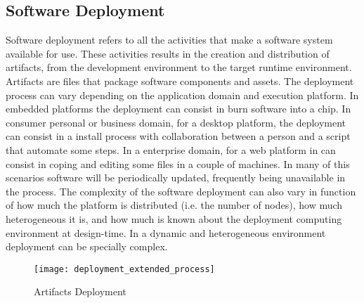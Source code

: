\subsection{Software Deployment}

Software deployment refers to all the activities that make a software system available for use\cite{carzaniga_characterization_1998}. These activities results
in the creation and distribution of artifacts,  from the development environment to the target runtime environment. Artifacts are files that package software components and assets. The deployment process can vary depending on the application domain and execution platform. In embedded platforms the deployment can consist in burn software into a chip. In consumer personal or business domain, for a desktop platform, the deployment can consist in a install process with collaboration between a person and a script that automate some steps.
In a enterprise domain, for a web platform in can consist in coping and editing some files in a couple of machines. In many of this scenarios software will be periodically updated, frequently being unavailable in the process.
The complexity of the software deployment can also vary in function of how much the platform is distributed (i.e. the number of nodes), how much heterogeneous it is, and how much is known about the deployment computing environment at design-time. In a dynamic and heterogeneous environment deployment can be specially complex.

\label{sub:deployment}
\begin{figure}[!htb]
  \centering
  \texttt{[image: deployment\_extended\_process]}
  \caption{Artifacts Deployment}
  \label{fig:deployment_extended_process}
\end{figure}


